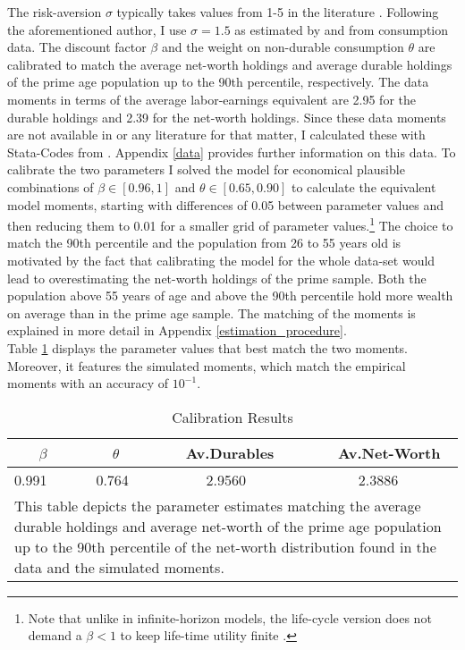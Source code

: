 \documentclass[a4paper,12pt,legno]{article}
\begin{document}
The risk-aversion $\sigma$ typically takes values from 1-5 in the literature \citep{yang2009}. Following the aforementioned author, I use $\sigma = 1.5$ as estimated by \cite{attanasio1999} and \cite{Gourinchas&Parker2002} from consumption data. The discount factor $\beta$ and the weight on non-durable consumption $\theta$ are calibrated to match the average net-worth holdings and average durable holdings of the prime age population up to the 90th percentile, respectively. The data moments in terms of the average labor-earnings equivalent are 2.95 for the durable holdings and 2.39 for the net-worth  holdings. Since these data moments are not available in \cite{hintermaier2011} or any literature for that matter, I calculated these with Stata-Codes from \cite{hintermaier2016}. Appendix \ref{data} provides further information on this data. To calibrate the two parameters I solved the model for economical plausible combinations of $\beta \in [0.96,1]$ and $\theta \in [0.65,0.90]$ to calculate the equivalent model moments, starting with differences of 0.05 between parameter values and then reducing them to 0.01 for a smaller grid of parameter values.\footnote{Note that unlike in infinite-horizon models, the life-cycle version does not demand a $\beta < 1$ to keep life-time utility finite \cite[p. 360]{heer2004dge}.} The choice to match the 90th percentile and the population from 26 to 55 years old is motivated by the fact that calibrating the model for the whole data-set would lead to overestimating the net-worth holdings of the prime sample. Both the population
above 55 years of age and above the 90th percentile hold more wealth on average than
in the prime age sample. The matching of the moments is explained in more detail in Appendix \ref{estimation_procedure}. \\
Table \ref{estimates} displays the parameter values that best match the two moments. Moreover, it features the simulated moments, which match the empirical moments with an accuracy of $10^{-1}$.

\begin{table}[!htbp]
\centering
\caption{Calibration Results}
\label{estimates}
\begin{tabular}{@{}llll@{}}
\toprule
\ \ \ $\beta$ & \ \ $\theta$ & \ Av.Durables & \ Av.Net-Worth \\ \midrule
0.991 \ \ \ \   & 0.764 \ \ \ \ & \ \ \ \ 2.9560 & \ \ \ \ 2.3886  \\ \bottomrule
\multicolumn{4}{l}{%
  \begin{minipage}{9.5cm}%
    \small This table depicts the parameter estimates matching the average durable holdings and average net-worth of the prime age population up to the 90th percentile of the net-worth distribution found in the data and the simulated moments.  
  \end{minipage}%
}\\
\end{tabular}
\end{table}
\end{document}
